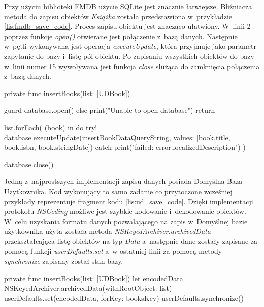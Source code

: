 Przy użyciu biblioteki FMDB użycie SQLite jest znacznie łatwiejsze. Bliźniacza metoda do zapisu obiektów \textit{Książka} została przedstawiona w~przykładzie \ref{lis:fmdb_save_code}. Proces zapisu obiektu jest znacząco ułatwiony. W~linii 2 poprzez funkcje \textit{open()} otwierane jest połączenie z~bazą danych. Następnie w~pętli wykonywana jest operacja \textit{executeUpdate}, która przyjmuje jako parametr zapytanie do bazy i~listę pól obiektu. Po zapisaniu wszystkich obiektów do bazy w~linii numer 15 wywoływana jest funkcja \textit{close} służąca do zamknięcia połączenia z~bazą danych. 

\begin{code}[
		language=swift,
		caption={Przykład zapisu obiektu FMDB},
		label={lis:fmdb_save_code},
	]
    private func insertBooks(list: [UDBook]) {
        guard database.open() else {
            print("Unable to open database")
            return
        }
        
        list.forEach({ (book) in
            do {
                try! database.executeUpdate(insertBookDataQueryString, values: [book.title, book.isbn, book.stringDate])
            } catch {
                print("failed: error.localizedDescription")
            }
        })
        
        database.close()
    }
\end{code}

Jedną z~najprostszych implementacji zapisu danych posiada Domyślna Baza Użytkownika. Kod wykonujący to samo zadanie co przytoczone wcześniej przykłady reprezentuje fragment kodu \ref{lis:ud_save_code}. Dzięki implementacji protokołu \textit{NSCoding} możliwe jest szybkie kodowanie i~dekodowanie obiektów. W~celu uzyskania formatu danych pozwalającego na zapis w~Domyślnej bazie użytkownika użyta została metoda \textit{NSKeyedArchiver.archivedData} przekształcająca listę obiektów na typ \textit{Data} a~następnie dane zostały zapisane za pomocą funkcji \textit{userDefaults.set} a~w ostatniej linii za pomocą metody \textit{synchronize} zapisany został stan bazy. 

\begin{code}[
		language=swift,
		caption={Przykład zapisu obiektu User Defaults},
		label={lis:ud_save_code},
	]
    private func insertBooks(list: [UDBook]) {
        let encodedData = NSKeyedArchiver.archivedData(withRootObject: list)
        userDefaults.set(encodedData, forKey: booksKey)
        userDefaults.synchronize()
    }
\end{code}

